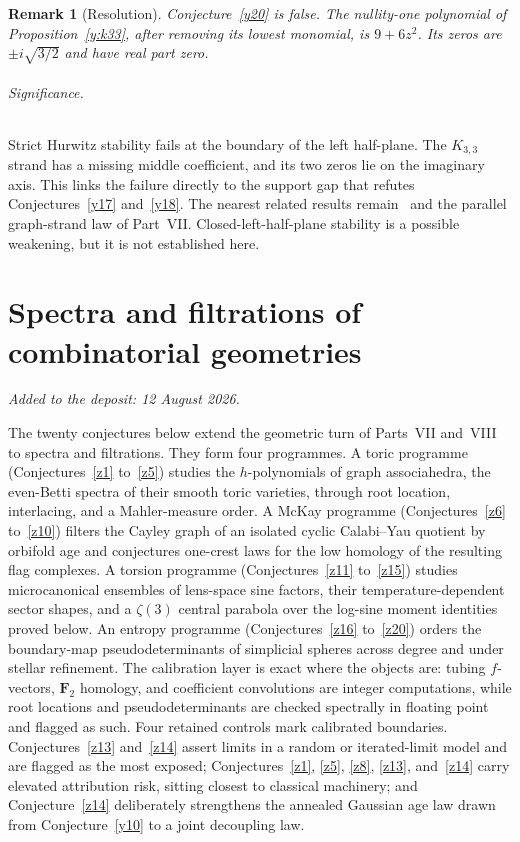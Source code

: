 \documentclass[11pt]{article}
\newtheorem{remark}{Remark}
\theoremstyle{definition}
\begin{document}
\begin{remark}[Resolution]\label{y20:res}
Conjecture~\ref{y20} is false.  The nullity-one polynomial of Proposition~\ref{y:k33}, after removing its lowest monomial, is $9+6z^2$.  Its zeros are $\pm i\sqrt{3/2}$ and have real part zero.
\end{remark}

\paragraph{Significance.}
Strict Hurwitz stability fails at the boundary of the left half-plane.  The $K_{3,3}$ strand has a missing middle coefficient, and its two zeros lie on the imaginary axis.  This links the failure directly to the support gap that refutes Conjectures~\ref{y17} and~\ref{y18}.  The nearest related results remain~\cite{Hoch77,BP15} and the parallel graph-strand law of Part~VII.  Closed-left-half-plane stability is a possible weakening, but it is not established here.

\part{Spectra and filtrations of combinatorial geometries}

\medskip\noindent\emph{Added to the deposit: 12 August 2026.}\par\medskip

The twenty conjectures below extend the geometric turn of Parts~VII and~VIII to spectra and filtrations.  They form four programmes.  A toric programme (Conjectures~\ref{z1} to~\ref{z5}) studies the $h$-polynomials of graph associahedra, the even-Betti spectra of their smooth toric varieties, through root location, interlacing, and a Mahler-measure order.  A McKay programme (Conjectures~\ref{z6} to~\ref{z10}) filters the Cayley graph of an isolated cyclic Calabi--Yau quotient by orbifold age and conjectures one-crest laws for the low homology of the resulting flag complexes.  A torsion programme (Conjectures~\ref{z11} to~\ref{z15}) studies microcanonical ensembles of lens-space sine factors, their temperature-dependent sector shapes, and a $\zeta(3)$ central parabola over the log-sine moment identities proved below.  An entropy programme (Conjectures~\ref{z16} to~\ref{z20}) orders the boundary-map pseudodeterminants of simplicial spheres across degree and under stellar refinement.  The calibration layer is exact where the objects are: tubing $f$-vectors, $\mathbf F_2$ homology, and coefficient convolutions are integer computations, while root locations and pseudodeterminants are checked spectrally in floating point and flagged as such.  Four retained controls mark calibrated boundaries.  Conjectures~\ref{z13} and~\ref{z14} assert limits in a random or iterated-limit model and are flagged as the most exposed; Conjectures~\ref{z1}, \ref{z5}, \ref{z8}, \ref{z13}, and~\ref{z14} carry elevated attribution risk, sitting closest to classical machinery; and Conjecture~\ref{z14} deliberately strengthens the annealed Gaussian age law drawn from Conjecture~\ref{y10} to a joint decoupling law.
\end{document}
